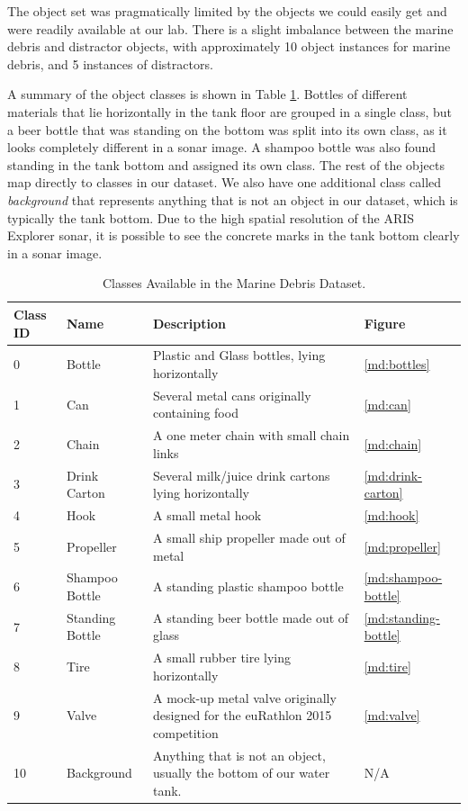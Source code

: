 The object set was pragmatically limited by the objects we could easily get and were readily available at our lab. There is a slight imbalance between the marine debris and distractor objects, with approximately 10 object instances for marine debris, and 5 instances of distractors.

A summary of the object classes is shown in Table \ref{md:classes}. Bottles of different materials that lie horizontally in the tank floor are grouped in a single class, but a beer bottle that was standing on the bottom was split into its own class, as it looks completely different in a sonar image. A shampoo bottle was also found standing in the tank bottom and assigned its own class. The rest of the objects map directly to classes in our dataset. We also have one additional class called \textit{background} that represents anything that is not an object in our dataset, which is typically the tank bottom. Due to the high spatial resolution of the ARIS Explorer sonar, it is possible to see the concrete marks in the tank bottom clearly in a sonar image.

\begin{table}[t]
    \begin{tabular}{llp{8cm}l}
        \hline 
        Class ID 	& Name 				& Description & Figure\\ 
        \hline 
        0			& Bottle			& Plastic and Glass bottles, lying horizontally & \ref{md:bottles}\\
        1			& Can				& Several metal cans originally containing food & \ref{md:can} \\
        2			& Chain				& A one meter chain with small chain links & \ref{md:chain}\\
        3			& Drink Carton		& Several milk/juice drink cartons lying horizontally & \ref{md:drink-carton} \\
        4			& Hook				& A small metal hook & \ref{md:hook} \\
        5			& Propeller			& A small ship propeller made out of metal & \ref{md:propeller} \\
        6			& Shampoo Bottle	& A standing plastic shampoo bottle & \ref{md:shampoo-bottle} \\
        7			& Standing Bottle	& A standing beer bottle made out of glass & \ref{md:standing-bottle}\\
        8			& Tire				& A small rubber tire lying horizontally & \ref{md:tire}\\
        9			& Valve				& A mock-up metal valve originally designed for the euRathlon 2015 competition & \ref{md:valve}\\
        10			& Background		& Anything that is not an object, usually the bottom of our water tank. & N/A\\
        \hline 
    \end{tabular} 
    \vspace*{0.5cm}
    \caption{Classes Available in the Marine Debris Dataset.}
    \label{md:classes}
\end{table}

